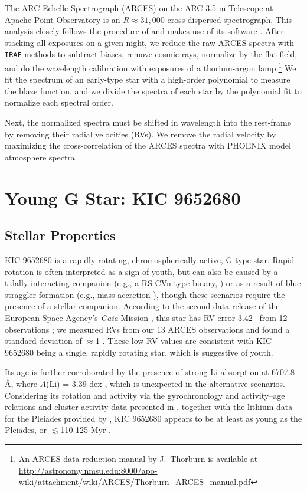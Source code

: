 The ARC Echelle Spectrograph (ARCES) on the ARC 3.5 m Telescope at Apache Point Observatory is an $R\approx31,000$ cross-dispersed spectrograph.  This analysis closely follows the procedure of \citet{Morris2017b} and makes use of its software \citep{aesop}. After stacking all exposures on a given night, we reduce the raw ARCES spectra with \texttt{IRAF} methods to subtract biases, remove cosmic rays, normalize by the flat field, and do the wavelength calibration with exposures of a thorium-argon lamp.\footnote{An ARCES data reduction manual by J.~Thorburn is available at \url{http://astronomy.nmsu.edu:8000/apo-wiki/attachment/wiki/ARCES/Thorburn_ARCES_manual.pdf}} We fit the spectrum of an early-type star with a high-order polynomial to measure the blaze function, and we divide the spectra of each star by the polynomial fit to normalize each spectral order.

Next, the normalized spectra must be shifted in wavelength into the rest-frame by removing their radial velocities (RVs). We remove the radial velocity by maximizing the cross-correlation of the ARCES spectra with PHOENIX model atmosphere spectra \citep{Husser2013}.

\section{Young G Star: KIC 9652680} \label{sec:gstar}
\subsection{Stellar Properties}
%
KIC 9652680 is a rapidly-rotating, 
chromospherically active, G-type star. 
Rapid rotation is often interpreted as a sign of youth, 
but can also be caused by a tidally-interacting companion (e.g., a RS CVn type binary, \citealt{Eaton1979})
or as a result of blue straggler formation (e.g., mass accretion \citealt{bluestraggler}), 
though these scenarios require the presence of a stellar companion. 
According to the 
second data release of the European Space Agency's \textit{Gaia} Mission \citep[DR2][]{GaiaDR2}, 
this star has RV error 3.42 \kms\ from 12 observations
\citep{DR2RV1, DR2RV2}; 
we measured RVs from our 13 ARCES observations and found a 
standard deviation of $\approx$1 \kms. These low RV values 
are consistent with KIC 9652680 being a single, rapidly rotating star, 
which is suggestive of youth. 

Its age is further corroborated by the presence of strong Li absorption at 6707.8 \AA, where $A$(Li) = 3.39 dex \citep{Honda2015}, which is unexpected in the alternative scenarios.
Considering its rotation and activity via the gyrochronology and activity--age relations 
and cluster activity data presented in \citet{Mamajek2008}, 
together with the lithium data for the Pleiades provided by  \citet{Bouvier2018}, 
KIC 9652680 appears to be at least as young 
as the Pleiades, or $\lesssim$110-125 Myr \citep{DR2HRD, Stauffer1998}. 

